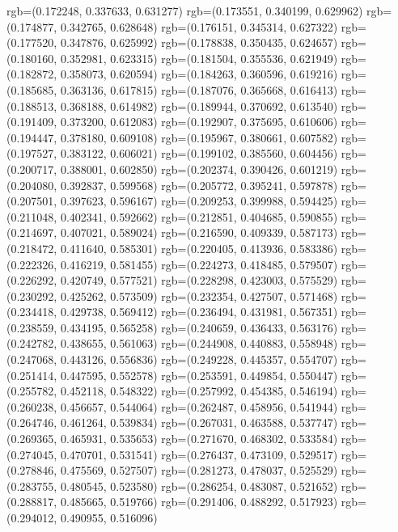 {{{					rgb=(0.172248, 0.337633, 0.631277)
					rgb=(0.173551, 0.340199, 0.629962)
					rgb=(0.174877, 0.342765, 0.628648)
					rgb=(0.176151, 0.345314, 0.627322)
					rgb=(0.177520, 0.347876, 0.625992)
					rgb=(0.178838, 0.350435, 0.624657)
					rgb=(0.180160, 0.352981, 0.623315)
					rgb=(0.181504, 0.355536, 0.621949)
					rgb=(0.182872, 0.358073, 0.620594)
					rgb=(0.184263, 0.360596, 0.619216)
					rgb=(0.185685, 0.363136, 0.617815)
					rgb=(0.187076, 0.365668, 0.616413)
					rgb=(0.188513, 0.368188, 0.614982)
					rgb=(0.189944, 0.370692, 0.613540)
					rgb=(0.191409, 0.373200, 0.612083)
					rgb=(0.192907, 0.375695, 0.610606)
					rgb=(0.194447, 0.378180, 0.609108)
					rgb=(0.195967, 0.380661, 0.607582)
					rgb=(0.197527, 0.383122, 0.606021)
					rgb=(0.199102, 0.385560, 0.604456)
					rgb=(0.200717, 0.388001, 0.602850)
					rgb=(0.202374, 0.390426, 0.601219)
					rgb=(0.204080, 0.392837, 0.599568)
					rgb=(0.205772, 0.395241, 0.597878)
					rgb=(0.207501, 0.397623, 0.596167)
					rgb=(0.209253, 0.399988, 0.594425)
					rgb=(0.211048, 0.402341, 0.592662)
					rgb=(0.212851, 0.404685, 0.590855)
					rgb=(0.214697, 0.407021, 0.589024)
					rgb=(0.216590, 0.409339, 0.587173)
					rgb=(0.218472, 0.411640, 0.585301)
					rgb=(0.220405, 0.413936, 0.583386)
					rgb=(0.222326, 0.416219, 0.581455)
					rgb=(0.224273, 0.418485, 0.579507)
					rgb=(0.226292, 0.420749, 0.577521)
					rgb=(0.228298, 0.423003, 0.575529)
					rgb=(0.230292, 0.425262, 0.573509)
					rgb=(0.232354, 0.427507, 0.571468)
					rgb=(0.234418, 0.429738, 0.569412)
					rgb=(0.236494, 0.431981, 0.567351)
					rgb=(0.238559, 0.434195, 0.565258)
					rgb=(0.240659, 0.436433, 0.563176)
					rgb=(0.242782, 0.438655, 0.561063)
					rgb=(0.244908, 0.440883, 0.558948)
					rgb=(0.247068, 0.443126, 0.556836)
					rgb=(0.249228, 0.445357, 0.554707)
					rgb=(0.251414, 0.447595, 0.552578)
					rgb=(0.253591, 0.449854, 0.550447)
					rgb=(0.255782, 0.452118, 0.548322)
					rgb=(0.257992, 0.454385, 0.546194)
					rgb=(0.260238, 0.456657, 0.544064)
					rgb=(0.262487, 0.458956, 0.541944)
					rgb=(0.264746, 0.461264, 0.539834)
					rgb=(0.267031, 0.463588, 0.537747)
					rgb=(0.269365, 0.465931, 0.535653)
					rgb=(0.271670, 0.468302, 0.533584)
					rgb=(0.274045, 0.470701, 0.531541)
					rgb=(0.276437, 0.473109, 0.529517)
					rgb=(0.278846, 0.475569, 0.527507)
					rgb=(0.281273, 0.478037, 0.525529)
					rgb=(0.283755, 0.480545, 0.523580)
					rgb=(0.286254, 0.483087, 0.521652)
					rgb=(0.288817, 0.485665, 0.519766)
					rgb=(0.291406, 0.488292, 0.517923)
					rgb=(0.294012, 0.490955, 0.516096)
}}}
